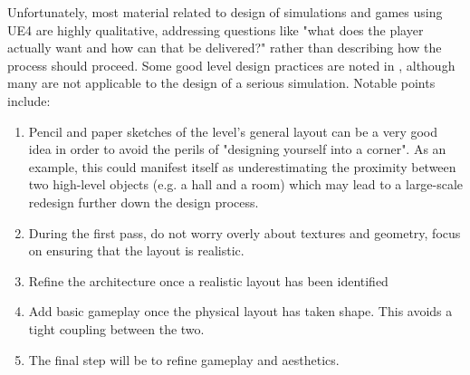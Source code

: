 Unfortunately, most material related to design of simulations and games using UE4 are highly qualitative, addressing questions like "what does the player actually want and how can that be delivered?" rather than describing how the process should proceed. Some good level design practices are noted in \cite{Rouse2005GamePractice}, although many are not applicable to the design of a serious simulation. Notable points include:
\begin{enumerate}
    \item Pencil and paper sketches of the level's general layout can be a very good idea in order to avoid the perils of "designing yourself into a corner". As an example, this could manifest itself as underestimating the proximity between two high-level objects (e.g. a hall and a room) which may lead to a large-scale redesign further down the design process.
    \item During the first pass, do not worry overly about textures and geometry, focus on ensuring that the layout is realistic.
    \item Refine the architecture once a realistic layout has been identified
    \item Add basic gameplay once the physical layout has taken shape. This avoids a tight coupling between the two.
    \item The final step will be to refine gameplay and aesthetics.
\end{enumerate}

